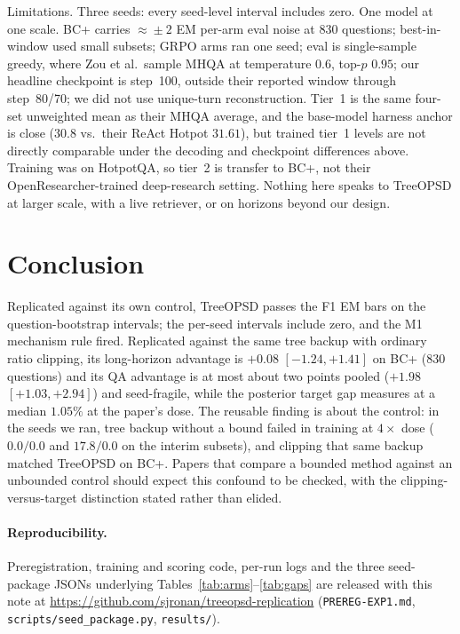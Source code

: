 \documentclass[11pt]{article}
\begin{document}
Limitations. Three seeds: every seed-level interval includes zero. One
model at one scale. BC+ carries $\approx\!\pm2$ EM per-arm eval noise at
830 questions; best-in-window used small subsets; GRPO arms ran one seed;
eval is single-sample greedy, where Zou et al.\ sample MHQA at
temperature $0.6$, top-$p$ $0.95$; our headline checkpoint is step~100,
outside their reported window through step~80/70; we did not use
unique-turn reconstruction. Tier~1 is the same four-set unweighted mean
as their MHQA average, and the base-model harness anchor is close
($30.8$ vs.\ their ReAct Hotpot $31.61$), but trained tier~1 levels are
not directly comparable under the decoding and checkpoint differences
above. Training was on HotpotQA, so tier~2 is transfer to BC+, not their
OpenResearcher-trained deep-research setting. Nothing here speaks to
TreeOPSD at larger scale, with a live retriever, or on horizons beyond
our design.

\section{Conclusion}

Replicated against its own control, TreeOPSD passes the F1 EM bars on
the question-bootstrap intervals; the per-seed intervals include zero,
and the M1 mechanism rule fired.
Replicated against the same tree backup with ordinary ratio clipping,
its long-horizon advantage is $+0.08$ $[-1.24, +1.41]$ on BC+ (830
questions) and its QA advantage is at most about two points pooled
($+1.98$ $[+1.03, +2.94]$) and seed-fragile, while the posterior target
gap measures at a median $1.05\%$ at the paper's dose. The reusable
finding is about the control: in the seeds we ran, tree backup without
a bound failed in training at $4\times$ dose ($0.0/0.0$ and $17.8/0.0$
on the interim subsets), and clipping that same backup matched
TreeOPSD on BC+. Papers that compare a bounded method against an
unbounded control should expect this confound to be checked, with the
clipping-versus-target distinction stated rather than elided.

\paragraph{Reproducibility.} Preregistration, training and scoring code,
per-run logs and the three seed-package JSONs underlying
Tables~\ref{tab:arms}--\ref{tab:gaps} are released with this note at
\url{https://github.com/sjronan/treeopsd-replication}
(\texttt{PREREG-EXP1.md}, \texttt{scripts/seed\_package.py},
\texttt{results/}).
\end{document}
